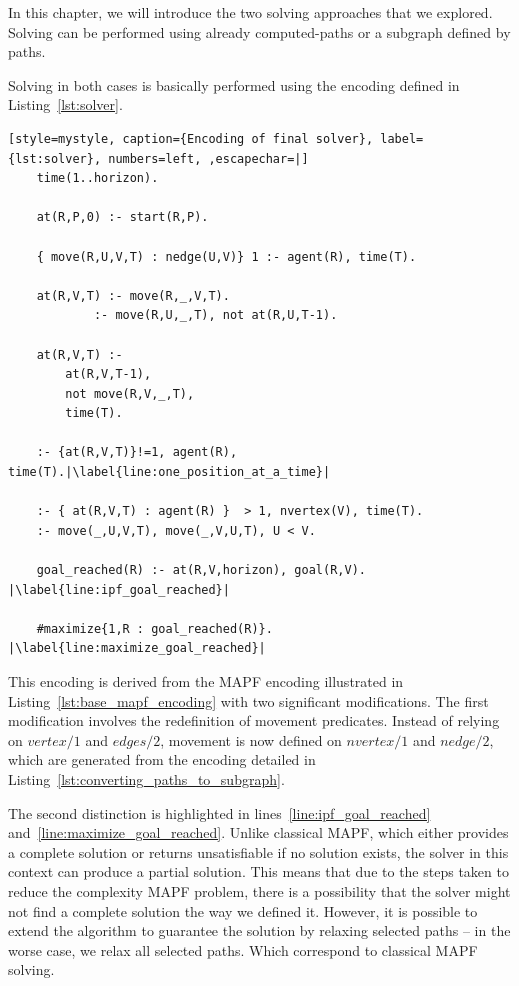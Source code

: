 In this chapter, we will introduce the two solving approaches that we explored. Solving can be performed using already computed-paths or a subgraph defined by paths.

Solving in both cases is basically performed using the encoding defined in Listing~\ref{lst:solver}.

\begin{minipage}[H]{\linewidth}
\begin{lstlisting}[style=mystyle, caption={Encoding of final solver}, label={lst:solver}, numbers=left, ,escapechar=|]
    time(1..horizon).

    at(R,P,0) :- start(R,P).

    { move(R,U,V,T) : nedge(U,V)} 1 :- agent(R), time(T).

    at(R,V,T) :- move(R,_,V,T).
            :- move(R,U,_,T), not at(R,U,T-1).

    at(R,V,T) :- 
        at(R,V,T-1), 
        not move(R,V,_,T), 
        time(T).

    :- {at(R,V,T)}!=1, agent(R), time(T).|\label{line:one_position_at_a_time}|

    :- { at(R,V,T) : agent(R) }  > 1, nvertex(V), time(T).
    :- move(_,U,V,T), move(_,V,U,T), U < V.

    goal_reached(R) :- at(R,V,horizon), goal(R,V). |\label{line:ipf_goal_reached}|

    #maximize{1,R : goal_reached(R)}. |\label{line:maximize_goal_reached}|
\end{lstlisting}
\end{minipage}


This encoding is derived from the MAPF encoding illustrated in Listing~\ref{lst:base_mapf_encoding} with two significant modifications. The first modification involves the redefinition of movement predicates. Instead of relying on \(vertex/1\) and \(edges/2\), movement is now defined on \(nvertex/1\) and \(nedge/2\), which are generated from the encoding detailed in Listing~\ref{lst:converting_paths_to_subgraph}.

The second distinction is highlighted in lines~\ref{line:ipf_goal_reached} and~\ref{line:maximize_goal_reached}. Unlike classical MAPF, which either provides a complete solution or returns unsatisfiable if no solution exists, the solver in this context can produce a partial solution. This means that due to the steps taken to reduce the complexity MAPF problem, there is a possibility that the solver might not find a complete solution the way we defined it. However, it is possible to extend the algorithm to guarantee the solution by relaxing selected paths -- in the worse case, we relax all selected paths. Which correspond to classical MAPF solving. 


